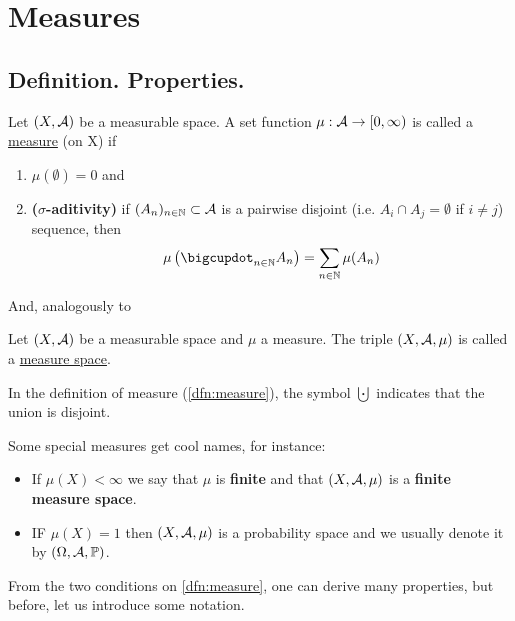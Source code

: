 
\chapter{Measures}

\section{Definition. Properties.}

\begin{dfn}[Measure]
	\label{dfn:measure}
	Let $(X, \mathcal{A})$ be a measurable space. A set function $\mu: \mathcal{A} \to [0, \infty)$ is called a \underline{measure} (on X) if
	\begin{enumerate}
		\item $\mu(\emptyset) = 0$ and
		\item \textbf{($\sigma$-aditivity)} if $(A_n)_{n\in \mathbb{N}} \subset \mathcal{A}$ is a pairwise disjoint (i.e. $A_i \cap A_j = \emptyset$ if $i \neq j$) sequence, then
		\begin{align*}
			\mu\left(\bigcupdot_{n \in \N} A_n\right) = \sum_{n\in \N} \mu(A_n)
		\end{align*}
	\end{enumerate}
\end{dfn}

And, analogously to \sigas

\begin{dfn}
	Let $(X, \mathcal{A})$ be a measurable space and $\mu$ a measure. The triple $(X, \mathcal{A}, \mu)$ is called a \underline{measure space}.
\end{dfn}

In the definition of measure (\ref{dfn:measure}), the symbol $\bigcupdot$ indicates that the union is disjoint.

Some special measures get cool names, for instance:

\begin{itemize}
	\item If $\mu(X) < \infty$ we say that $\mu$ is \textbf{finite} and that $(X, \mathcal{A}, \mu)$ is a \textbf{finite measure space}.
	\item IF $\mu(X) = 1$ then $(X, \mathcal{A}, \mu)$ is a probability space and we usually denote it by $(\Omega, \mathcal{A}, \mathbb{P})$.
\end{itemize}

From the two conditions on \ref{dfn:measure}, one can derive many properties, but before, let us introduce some notation.

